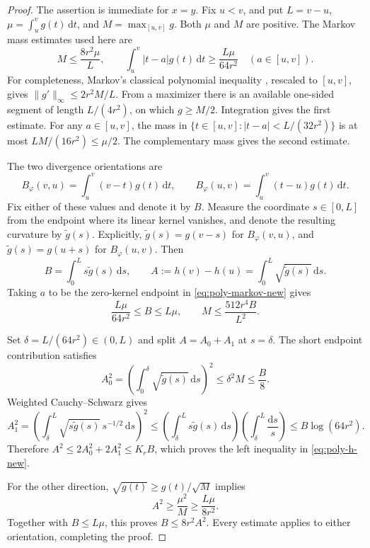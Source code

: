 \begin{proof}
The assertion is immediate for $x=y$. Fix $u<v$, and put
$L=v-u$, $\mu=\int_u^v g(t)\,\mathrm dt$, and
$M=\max_{[u,v]}g$. Both $\mu$ and $M$ are positive.
The Markov mass estimates used here are
\begin{equation}
 M\le\frac{8r^2\mu}{L},\qquad
 \int_u^v|t-a|g(t)\,\mathrm dt\ge\frac{L\mu}{64r^2}
 \quad (a\in[u,v]).
 \label{eq:poly-markov-new}
\end{equation}
For completeness, Markov's classical polynomial inequality
\cite{shadrin}, rescaled to $[u,v]$, gives
$\|g'\|_\infty\le2r^2M/L$. From a maximizer there is an available
one-sided segment of length $L/(4r^2)$, on which $g\ge M/2$.
Integration gives the first estimate. For any $a\in[u,v]$, the mass in
$\{t\in[u,v]:|t-a|<L/(32r^2)\}$ is at most
$LM/(16r^2)\le\mu/2$. The complementary mass gives the second estimate.

The two divergence orientations are
\[
 B_\varphi(v,u)=\int_u^v(v-t)g(t)\,\mathrm dt,
 \qquad
 B_\varphi(u,v)=\int_u^v(t-u)g(t)\,\mathrm dt.
\]
Fix either of these values and denote it by $B$. Measure the coordinate
$s\in[0,L]$ from the endpoint where its linear kernel vanishes, and denote
the resulting curvature by $\widetilde g(s)$. Explicitly,
$\widetilde g(s)=g(v-s)$ for $B_\varphi(v,u)$, and
$\widetilde g(s)=g(u+s)$ for $B_\varphi(u,v)$. Then
\[
 B=\int_0^L s\widetilde g(s)\,\mathrm ds,
 \qquad A:=h(v)-h(u)=\int_0^L\sqrt{\widetilde g(s)}\,\mathrm ds.
\]
Taking $a$ to be the zero-kernel endpoint in
\eqref{eq:poly-markov-new} gives
\begin{equation}
 \frac{L\mu}{64r^2}\le B\le L\mu,
 \qquad
 M\le\frac{512r^4B}{L^2}.
 \label{eq:poly-BM-new}
\end{equation}

Set $\delta=L/(64r^2)\in(0,L)$ and split $A=A_0+A_1$ at
$s=\delta$. The short endpoint contribution satisfies
\[
 A_0^2=\left(\int_0^\delta\sqrt{\widetilde g(s)}\,\mathrm ds\right)^2
 \le\delta^2M\le\frac{B}{8}.
\]
Weighted Cauchy--Schwarz gives
\[
 A_1^2
 =\left(\int_\delta^L
       \sqrt{s\widetilde g(s)}\,s^{-1/2}\,\mathrm ds\right)^2
 \le\left(\int_\delta^L s\widetilde g(s)\,\mathrm ds\right)
       \left(\int_\delta^L\frac{\mathrm ds}{s}\right)
 \le B\log(64r^2).
\]
Therefore $A^2\le2A_0^2+2A_1^2\le K_rB$, which proves the
left inequality in \eqref{eq:poly-h-new}.

For the other direction, $\sqrt{g(t)}\ge g(t)/\sqrt M$ implies
\[
 A^2\ge\frac{\mu^2}{M}\ge\frac{L\mu}{8r^2}.
\]
Together with $B\le L\mu$, this proves $B\le8r^2A^2$.
Every estimate applies to either orientation, completing the proof.
\end{proof}

